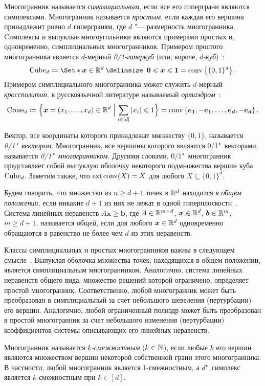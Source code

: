 Многогранник называется \emph{симплициальным}, если все его гиперграни являются симплексами.
Многогранник называется \emph{простым}, если каждая его вершина принадлежит ровно $d$ гиперграням, где $d$ "--- размерность многогранника.
Cимплексы и выпуклые многоугольники являются примерами простых и, одновременно, симплициальных многогранников. 
Примером простого многогранника является $d$-мерный \emph{0/1-гиперкуб} (или, короче, \emph{$d$-куб})~\cite{ZieglerBook}:
\[
\Cube_d \coloneqq \Set*{\bm{x} \in\R^d \given \bm{0} \le \bm{x} \le \bm{1}} 
= \conv\left\{\{0,1\}^d\right\}.
\]
Примером симплициального многогранника может служить $d$-мерный \emph{кроссполитоп}, в русскоязычной литературе называемый \emph{ортаэдром}~\cite{ZieglerBook}:
\[
\textup{Cross}_d \coloneqq \Bigl\{\bm{x} = (x_1,\dots,x_d)\in\mathbb{R}^d \Bigm| \sum_{i \in [d]} |x_i| \leqslant 1\Bigr\} 
= \operatorname{conv}\left\{\bm{e_1},-\bm{e_1},\dots,\bm{e_d},-\bm{e_d}\right\}.
\]

Вектор, все координаты которого принадлежат множеству $\{0, 1\}$, называется \emph{0/1"~вектором}.
Многогранник, все вершины которого являются 0/1"~векторами, называется \emph{0/1"~многогранником}.
Другими словами, 0/1"~многогранник представляет собой
выпуклую оболочку некоторого подмножества вершин куба $\textup{Cube}_d$.
Заметим также, что $\operatorname{ext}\operatorname{conv}(X) = X$ для любого $X \subseteq \{0, 1\}^d$.

Будем говорить, что множество из $n \ge d+1$ точек в $\mathbb{R}^d$ находится \emph{в общем положении}, если никакие $d+1$ из них не лежат в одной гиперплоскости~\cite{ZieglerBook}.
Система линейных неравенств 
\(A\bm{x} \ge \bm{b}\), где $A \in \mathbb{R}^{m\times d}$, $\bm{x}\in \mathbb{R}^d$, $\bm{b}\in \mathbb{R}^m$, $m \ge d+1$, называется \emph{общей}, если для любого $\bm{x}\in \mathbb{R}^d$ одновременно обращаются в равенство не более чем $d$ из этих неравенств.

Классы симплициальных и простых многогранников важны в следующем смысле~\cite{ZieglerBook}.
Выпуклая оболочка множества точек, находящихся в общем положении, является симплициальным многогранником.
Аналогично, система линейных неравенств общего вида, 
множество решений которой ограничено, определяет простой многогранник.
Соответственно, любой многогранник может быть преобразован в симплициальный за счет небольшого шевеления (пертурбации) его вершин.
Аналогично, любой ограниченный полиэдр может быть преобразован в простой многогранник за счет небольшого изменения (пертурбации) коэффициентов системы описывающих его линейных неравенств.

Многогранник называется \emph{$k$-смежностным} ($k\in \mathbb{N}$), если любые $k$ его вершин являются множеством вершин некоторой собственной грани этого многогранника.
В частности, любой многогранник является 1-смежностным, а $d$"~симплекс является $k$-смежностным при $k \in [d]$.

